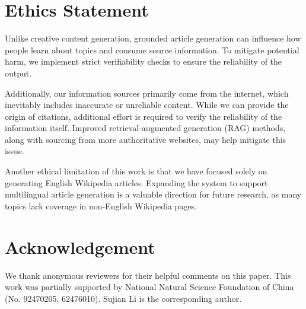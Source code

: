 \documentclass[11pt]{article}
\begin{document}

\section*{Ethics Statement}

Unlike creative content generation, grounded article generation can influence how people learn about topics and consume source information. To mitigate potential harm, we implement strict verifiability checks to ensure the reliability of the output. 

Additionally, our information sources primarily come from the internet, which inevitably includes inaccurate or unreliable content. While we can provide the origin of citations, additional effort is required to verify the reliability of the information itself. Improved retrieval-augmented generation (RAG) methods, along with sourcing from more authoritative websites, may help mitigate this issue.

Another ethical limitation of this work is that we have focused solely on generating English Wikipedia articles. Expanding the system to support multilingual article generation is a valuable direction for future research, as many topics lack coverage in non-English Wikipedia pages.

\section*{Acknowledgement}
We thank anonymous reviewers for their helpful comments on this paper. This work was partially supported by National Natural Science Foundation of China (No. 92470205, 62476010). Sujian Li is the corresponding author. 



\appendix
\newpage
\appendix
\onecolumn

\label{sec:appendix}
\end{document}
